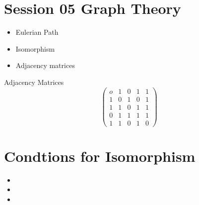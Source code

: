 \documentclass[]{report}
\begin{document}
\section*{Session 05 Graph Theory}
\begin{itemize}
\item Eulerian Path
\item Isomorphism
\item Adjacency matrices
\end{itemize}
Adjacency Matrices
\[ \left( \begin{matrix}
o & 1 & 0 & 1 & 1 \\ 
1 & 0 & 1 & 0 & 1 \\ 
1 & 1 & 0 & 1 & 1 \\ 
0 & 1 & 1 & 1 & 1 \\ 
1 & 1 & 0 & 1 & 0
\end{matrix} \right) \]


\newpage
\section*{Condtions for Isomorphism}
\begin{itemize}
\item
\item
\item
\end{itemize}
\end{document}
